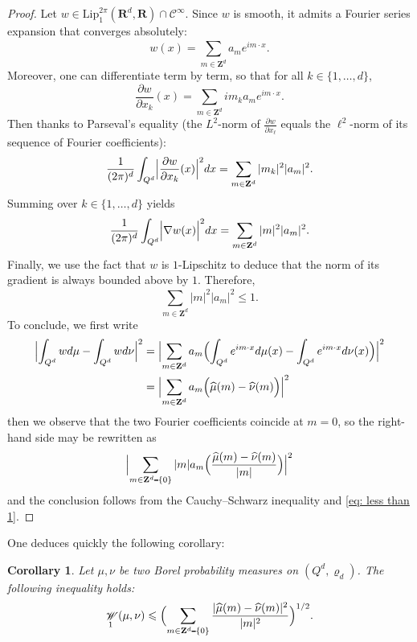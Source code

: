 \documentclass[12pt]{amsart}
\renewcommand{\mathcal}{\mathscr}
\def\setminus{\mathchoice
	{\mathbin{\vrule height .62ex width 1.61ex depth -.38ex}}%
	{\mathbin{\vrule height .62ex width 1.61ex depth -.38ex}}%
	{\mathbin{\vrule height .50ex width 0.85ex depth -.28ex}}%
	{\mathbin{\vrule height .20ex width 0.570ex depth -.24ex}}%
}
\newcommand{\Zz}{\mathbf{Z}}
\newcommand{\Rr}{\mathbf{R}}
\renewcommand{\hat}{\widehat}
\DeclareMathOperator{\wass}{\mathcal{W}}
\renewcommand{\rho}{\varrho}
\theoremstyle{plain}
\newtheorem{corollary}[theorem]{Corollary}
\theoremstyle{remark}
\theoremstyle{definition}
\begin{document}
\begin{proof}
  Let
  $w \in \mathrm{Lip}^{2\pi}_1(\Rr^d, \Rr) \cap
  \mathcal{C}^{\infty}$. Since $w$ is smooth, it admits a Fourier
  series expansion that converges absolutely:
  $$
  w(x)= \sum_{m \in \Zz^d}^{} a_m e^{i m \cdot x}.
  $$
  Moreover, one can differentiate term by term, so that for all $k \in \{1, \dots, d\}$, 
  $$
  \frac{\partial w}{\partial x_k} (x) = \sum_{m \in \Zz^d}^{} i m_{k} a_m  e^{i m \cdot x}.
  $$
  Then thanks to Parseval's equality (the $L^2$-norm of
  $ \frac{\partial w}{\partial x_\ell} $ equals the $\ell^2$-norm of
  its sequence of Fourier coefficients):
  $$
  \frac{1}{(2 \pi)^d} \int_{Q^d}^{} \Bigl| \frac{\partial w}{\partial
    x_k} (x)\Bigr|^2 dx = \sum_{m \in \Zz^d}^{} |m_k|^2
  |a_m|^2.
  $$
  Summing over $k \in \{1, \dots, d\}$ yields
  $$
  \frac{1}{(2 \pi)^d} \int_{Q^d}^{} \Bigl| \nabla w(x)\Bigr|^2
  dx = \sum_{m \in \Zz^d}^{} |m|^2 |a_m|^2.
  $$
  Finally, we use the fact that $w$ is $1$-Lipschitz to deduce that
  the norm of its gradient is always bounded above by $1$. Therefore,
  \begin{equation} \label{eq: less than 1}
    \sum_{m \in \Zz^d}^{} |m|^2 |a_m|^2 \leqslant 1.
  \end{equation}
  To conclude, we first write
  \begin{align*}
  \Bigl|\int_{Q^d} w d \mu - \int_{Q^d} w d \nu
  \Bigr|^2 &= \Bigl| \sum_{m \in \Zz^d} a_m \Bigl( \int_{Q^d} e^{i m
    \cdot x} d \mu (x)- \int_{Q^d} e^{i m \cdot x} d
             \nu(x) \Bigr) \Bigr|^2\\
    &= \Bigl| \sum_{m \in \Zz^d} a_m \Bigl(
  \hat{\mu}(m) - \hat{\nu}(m) \Bigr) \Bigr|^2
  \end{align*}
  then we observe that the two Fourier coefficients coincide at
  $m = 0$, so the right-hand side may be rewritten as
  $$
  \Bigl| \sum_{m \in \Zz^d\setminus \{0\}} |m|a_m \Bigl( \frac{
    \hat{\mu}(m) - \hat{\nu}(m) }{|m|} \Bigr) \Bigr|^2
  $$
  and the conclusion follows from the Cauchy--Schwarz inequality and
  \eqref{eq: less than 1}.
\end{proof}

One deduces quickly the following corollary:

\begin{corollary}\label{lem: without smoothing}
  Let $\mu, \nu$ be two Borel probability measures on $(Q^d,
  \rho_d)$. The following inequality holds:
  $$
  \wass_1(\mu,\nu) \leqslant \Bigl(\sum_{m \in \Zz^d \setminus
    \{0\}}^{} \frac{|\hat{\mu}(m) -
    \hat{\nu}(m)|^2}{|m|^2}\Bigr)^{1/2}.
  $$
\end{corollary}
\end{document}

